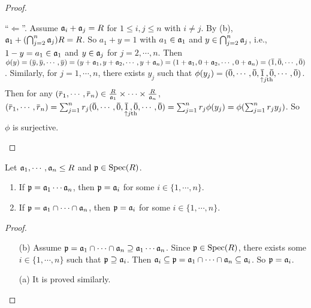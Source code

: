 \begin{proof}
\begin{enumerate}
            ``$\Leftarrow$''. Assume $\mathfrak{a}_i + \mathfrak{a}_j = R$ for $1 \leq i,j \leq n$ with $i \neq j$. By (b), $\mathfrak{a}_1 + (\bigcap_{j=2}^n \mathfrak{a}_j)R = R$. So $a_1 + y = 1$ with $a_1 \in \mathfrak{a}_1$ and $y \in \bigcap_{j=2}^n \mathfrak{a}_j$, i.e., $1-y = a_1 \in \mathfrak{a}_1$ and $y \in \mathfrak{a}_j$ for $j = 2,\cdots, n$. Then $\phi(y) = (\overbar y, \overbar y, \cdots, \overbar y) = (y + \ffa_1, y + \ffa_2, \cdots, y + \ffa_n) = (1+\ffa_1,0+\ffa_2,\cdots,0+\ffa_n) = (\overbar 1,\overbar 0, \cdots, \overbar 0)$. Similarly, for $j = 1,\cdots,n$, there exists $y_j$ such that $\phi(y_j) = (\overbar 0, \cdots, \overbar 0, \mathpunct{\underset{\mathclap{\substack{\ \ \ \uparrow j\text{th}\\ \textstyle }}}{\overbar 1}}, \overbar 0, \cdots, \overbar 0)$. Then for any $(\overbar r_1,\cdots, \overbar r_n) \in \frac{R}{\ffa_1} \times \cdots \times \frac{R}{\ffa_n}$, $(\overbar r_1,\cdots, \overbar r_n) = \sum_{j=1}^n r_j(\overbar 0, \cdots, \overbar 0, \mathpunct{\underset{\mathclap{\substack{\ \ \ \uparrow j\text{th} \\ \textstyle }}}{\overbar 1}}, \overbar 0, \cdots, \overbar 0) = \sum_{j=1}^n r_j\phi(y_j) = \phi(\sum_{j=1}^nr_jy_j)$. So $\phi$ is surjective. \qedhere
    \end{enumerate}
\end{proof}

\begin{proposition}
    Let $\mathfrak{a}_1,\cdots,\mathfrak{a}_n \leq R$ and $\mathfrak{p} \in \operatorname{Spec}(R)$.
    \begin{enumerate}
        \item If $\mathfrak{p} = \mathfrak{a}_1 \cdots \mathfrak{a}_n$, then $\mathfrak{p} = \mathfrak{a}_i$ for some $i \in \{1,\cdots,n\}$.
        \item If $\mathfrak{p} = \mathfrak{a}_1 \cap \cdots \cap \mathfrak{a}_n$, then $\mathfrak{p} = \mathfrak{a}_i$ for some $i \in \{1,\cdots,n\}$.
    \end{enumerate}
\end{proposition}

\begin{proof}
    \begin{enumerate}
        \item [(b)] Assume $\mathfrak{p} = \mathfrak{a}_1 \cap \cdots \cap \mathfrak{a}_n \supseteq \mathfrak{a}_1 \cdots \mathfrak{a}_n$. Since $\mathfrak{p} \in \operatorname{Spec}(R)$, there exists some $i \in \{1,\cdots,n\}$ such that $\mathfrak{p} \supseteq \mathfrak{a}_i$. Then $\mathfrak{a}_i \subseteq \mathfrak{p} = \mathfrak{a}_1 \cap \cdots \cap \mathfrak{a}_n \subseteq \mathfrak{a}_i$. So $\mathfrak{p} = \mathfrak{a}_i$. 
        \item[(a)] It is proved similarly. \qedhere
    \end{enumerate}
\end{proof}

